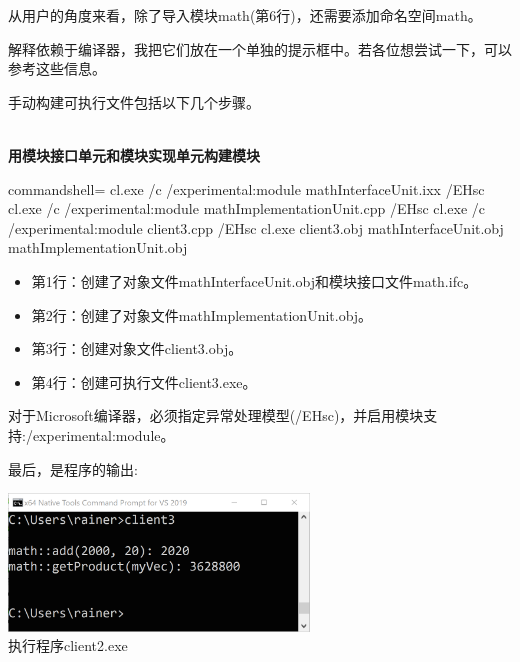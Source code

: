 从用户的角度来看，除了导入模块math(第6行)，还需要添加命名空间math。

解释依赖于编译器，我把它们放在一个单独的提示框中。若各位想尝试一下，可以参考这些信息。


\begin{tcolorbox}[breakable,enhanced jigsaw,colback=blue!5!white,colframe=blue!75!black,title={使用Microsoft编译器构建可执行文件}]
	
手动构建可执行文件包括以下几个步骤。

\hspace*{\fill} \\ %
\noindent
\textbf{用模块接口单元和模块实现单元构建模块}
{\footnotesize
\begin{tcblisting}{commandshell={}}
cl.exe /c /experimental:module mathInterfaceUnit.ixx /EHsc
cl.exe /c /experimental:module mathImplementationUnit.cpp /EHsc
cl.exe /c /experimental:module client3.cpp /EHsc
cl.exe client3.obj mathInterfaceUnit.obj mathImplementationUnit.obj
\end{tcblisting}
}

\begin{itemize}
\item 
第1行：创建了对象文件mathInterfaceUnit.obj和模块接口文件math.ifc。

\item 
第2行：创建了对象文件mathImplementationUnit.obj。

\item 
第3行：创建对象文件client3.obj。

\item 
第4行：创建可执行文件client3.exe。
\end{itemize}

对于Microsoft编译器，必须指定异常处理模型(/EHsc)，并启用模块支持:/experimental:module。

最后，是程序的输出:

\begin{center}
\includegraphics[width=0.6\textwidth]{content/3/chapter4/images/20.png}\\
执行程序client2.exe
\end{center}
\end{tcolorbox}

